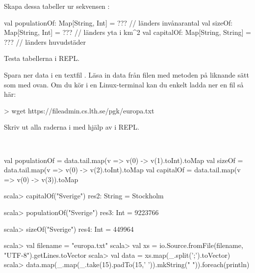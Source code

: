 \Subtask Skapa dessa tabeller ur sekvensen :
\begin{Code}
val populationOf: Map[String, Int]    = ???  // länders invånarantal
val sizeOf:       Map[String, Int]    = ???  // länders yta i km^2
val capitalOf:    Map[String, String] = ???  // länders huvudstäder
\end{Code}
Testa tabellerna i REPL.

\Subtask Spara ner data i en textfil . Läsa in data från filen med metoden  på liknande sätt som med   ovan. Om du kör i en Linux-terminal kan du enkelt ladda ner en fil så här:
\begin{REPLnonum}
> wget https://fileadmin.cs.lth.se/pgk/europa.txt
\end{REPLnonum}
Skriv ut alla raderna i  med hjälp av  i REPL.

\SOLUTION

\TaskSolved \what~

\SubtaskSolved
\begin{CodeSmall}
val populationOf = data.tail.map(v => v(0) -> v(1).toInt).toMap
val sizeOf       = data.tail.map(v => v(0) -> v(2).toInt).toMap
val capitalOf    = data.tail.map(v => v(0) -> v(3)).toMap
\end{CodeSmall}

\begin{REPL}
scala> capitalOf("Sverige")
res2: String = Stockholm

scala> populationOf("Sverige")
res3: Int = 9223766

scala> sizeOf("Sverige")
res4: Int = 449964
\end{REPL}

\begin{REPL}
scala> val filename = "europa.txt"
scala> val xs = io.Source.fromFile(filename, "UTF-8").getLines.toVector
scala> val data = xs.map(_.split(';').toVector)
scala> data.map(_.map(_.take(15).padTo(15,' ')).mkString(" ")).foreach(println)
\end{REPL}
\QUESTEND





\ExtraTasks %


\QUESTBEGIN

